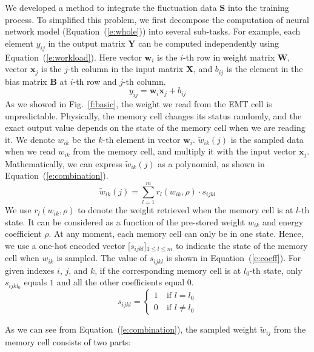 \documentclass[10pt,journal,compsoc]{IEEEtran}
\begin{document}
We developed a method to integrate the fluctuation data $\mathbf{S}$ into the training process. To simplified this problem, we first decompose the computation of neural network model (Equation~(\ref{e:whole})) into several sub-tasks. For example, each element $y_{ij}$ in the output matrix $\mathbf{Y}$ can be computed independently using Equation~(\ref{e:workload}). Here vector $\mathbf{w}_i$ is the $i$-th row in weight matrix $\mathbf{W}$, vector $\mathbf{x}_j$ is the $j$-th column in the input matrix $\mathbf{X}$, and $b_{ij}$ is the element in the bias matrix $\mathbf{B}$ at $i$-th row and $j$-th column.
\begin{equation}
y_{ij}  = \mathbf{w}_i\mathbf{x}_j+b_{ij}
\label{e:workload}
\end{equation}
As we showed in Fig.~\ref{f:basic}, the weight we read from the EMT cell is unpredictable. Physically, the memory cell changes its status randomly, and the exact output value depends on the state of the memory cell when we are reading it. We denote $w_{ik}$ be the $k$-th element in vector $\mathbf{w}_i$. $\widetilde{w}_{ik}(j)$ is the sampled data when we read $w_{ik}$ from the memory cell, and multiply it with the input vector $\mathbf{x}_j$. Mathematically, we can express $\widetilde{w}_{ik}(j)$ as a polynomial, as shown in Equation~(\ref{e:combination}).
\begin{equation}
\widetilde{w}_{ik}(j) = \sum_{l=1}^m{r_l(w_{ik}, \rho)\cdot s_{ijkl}} 
\label{e:combination}
\end{equation}
We use $r_l(w_{ik},\rho)$ to denote the weight retrieved when the memory cell is at $l$-th state. It can be considered as a function of the pre-stored weight $w_{ik}$ and energy coefficient $\rho$. At any moment, each memory cell can only be in one state. Hence, we use a one-hot encoded vector [$s_{ijkl}$]$_{1\leq l\leq m}$ to indicate the state of the memory cell when $w_{ik}$ is sampled. The value of $s_{ijkl}$ is shown in Equation~(\ref{e:coeff}). For given indexes $i$, $j$, and $k$, if the corresponding memory cell is at $l_{0}$-th state, only $s_{ijkl_0}$ equals $1$ and all the other coefficients equal $0$.
\begin{equation}
s_{ijkl}= 
\begin{cases}
    1  ~& \text{if } l = l_{0}\\
    0  ~& \text{if } l \neq l_{0}
\end{cases}
\label{e:coeff}
\end{equation}

As we can see from Equation~(\ref{e:combination}), the sampled weight $\widetilde{w}_{ij}$ from the memory cell consists of two parts:
\end{document}
